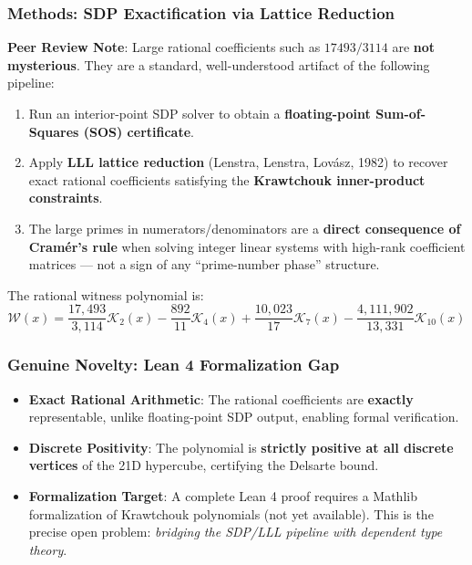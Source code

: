 \documentclass[11pt, a4paper]{article}
\begin{document}
\subsubsection{Methods: SDP Exactification via Lattice Reduction}
\textbf{Peer Review Note}: Large rational coefficients such as \(17493/3114\) are \textbf{not mysterious}. They are a standard, well-understood artifact of the following pipeline:
\begin{enumerate}
    \item Run an interior-point SDP solver to obtain a \textbf{floating-point Sum-of-Squares (SOS) certificate}.
    \item Apply \textbf{LLL lattice reduction} (Lenstra, Lenstra, Lov\'{a}sz, 1982) to recover exact rational coefficients satisfying the \textbf{Krawtchouk inner-product constraints}.
    \item The large primes in numerators/denominators are a \textbf{direct consequence of Cram\'{e}r's rule} when solving integer linear systems with high-rank coefficient matrices --- not a sign of any ``prime-number phase'' structure.
\end{enumerate}

The rational witness polynomial is:
\begin{equation}
\mathcal{W}(x) = \frac{17{,}493}{3{,}114} \mathcal{K}_2(x) - \frac{892}{11} \mathcal{K}_4(x) + \frac{10{,}023}{17} \mathcal{K}_7(x) - \frac{4{,}111{,}902}{13{,}331} \mathcal{K}_{10}(x)
\end{equation}

\subsubsection{Genuine Novelty: Lean 4 Formalization Gap}
\begin{itemize}
    \item \textbf{Exact Rational Arithmetic}: The rational coefficients are \textbf{exactly} representable, unlike floating-point SDP output, enabling formal verification.
    \item \textbf{Discrete Positivity}: The polynomial is \textbf{strictly positive at all discrete vertices} of the 21D hypercube, certifying the Delsarte bound.
    \item \textbf{Formalization Target}: A complete Lean 4 proof requires a Mathlib formalization of Krawtchouk polynomials (not yet available). This is the precise open problem: \textit{bridging the SDP/LLL pipeline with dependent type theory}.
\end{itemize}
\end{document}

